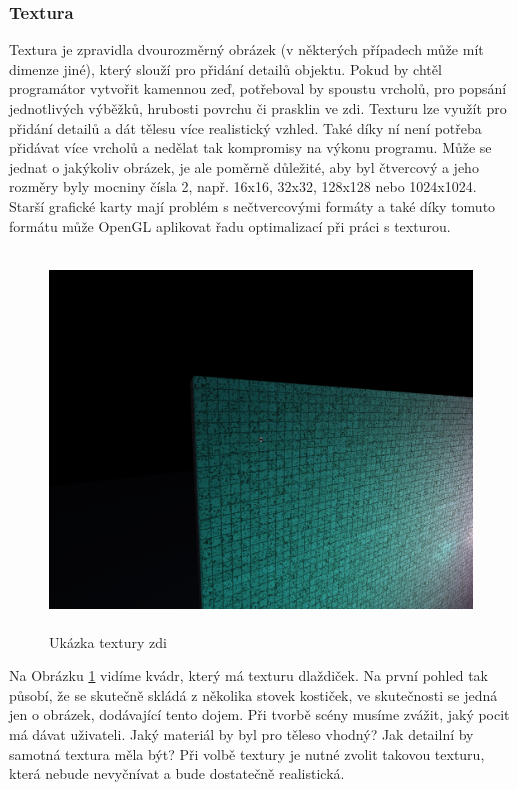 \documentclass[12pt]{article}
\begin{document}
\subsubsection{Textura}

Textura je zpravidla dvourozměrný obrázek (v některých případech může mít dimenze jiné), který slouží pro přidání detailů objektu. Pokud by chtěl programátor vytvořit kamennou zeď, potřeboval by spoustu vrcholů, pro popsání jednotlivých výběžků, hrubosti povrchu či prasklin ve zdi. Texturu lze využít pro přidání detailů a dát tělesu více realistický vzhled. Také díky ní není potřeba přidávat více vrcholů a nedělat tak kompromisy na výkonu programu. Může se jednat o jakýkoliv obrázek, je ale poměrně důležité, aby byl čtvercový a jeho rozměry byly mocniny čísla 2, např. 16x16, 32x32, 128x128 nebo 1024x1024. Starší grafické karty mají problém s nečtvercovými formáty a také díky tomuto formátu může OpenGL aplikovat řadu optimalizací při práci s texturou. \cite{texture}

\vspace{0.5cm}
\begin{figure}[h]
    \centering
    \includegraphics[height=10cm]{images/texture_example.png}
    \caption{Ukázka textury zdi}
    \label{fig:Ukázka textury zdi}
\end{figure}

Na Obrázku \ref{fig:Ukázka textury zdi} vidíme kvádr, který má texturu dlaždiček. Na první pohled tak působí, že se skutečně skládá z několika stovek kostiček, ve skutečnosti se jedná jen o obrázek, dodávající tento dojem. Při tvorbě scény musíme zvážit, jaký pocit má dávat uživateli. Jaký materiál by byl pro těleso vhodný? Jak detailní by samotná textura měla být? Při volbě textury je nutné zvolit takovou texturu, která nebude nevyčnívat a bude dostatečně realistická.
\end{document}

